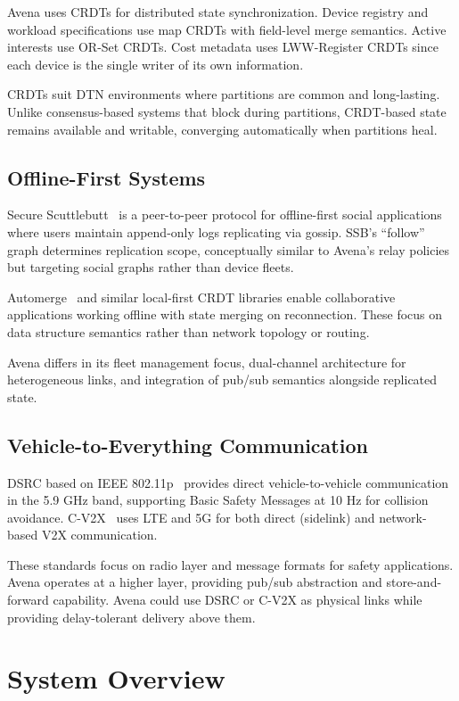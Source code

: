 \documentclass[journal]{IEEEtran}
\begin{document}
Avena uses CRDTs for distributed state synchronization. Device registry and workload specifications use map CRDTs with field-level merge semantics. Active interests use OR-Set CRDTs. Cost metadata uses LWW-Register CRDTs since each device is the single writer of its own information.

CRDTs suit DTN environments where partitions are common and long-lasting. Unlike consensus-based systems that block during partitions, CRDT-based state remains available and writable, converging automatically when partitions heal.

\subsection{Offline-First Systems}

Secure Scuttlebutt~\cite{tarr2019ssb} is a peer-to-peer protocol for offline-first social applications where users maintain append-only logs replicating via gossip. SSB's ``follow'' graph determines replication scope, conceptually similar to Avena's relay policies but targeting social graphs rather than device fleets.

Automerge~\cite{kleppmann2017automerge} and similar local-first CRDT libraries enable collaborative applications working offline with state merging on reconnection. These focus on data structure semantics rather than network topology or routing.

Avena differs in its fleet management focus, dual-channel architecture for heterogeneous links, and integration of pub/sub semantics alongside replicated state.

\subsection{Vehicle-to-Everything Communication}

DSRC based on IEEE 802.11p~\cite{ieee80211p} provides direct vehicle-to-vehicle communication in the 5.9 GHz band, supporting Basic Safety Messages at 10 Hz for collision avoidance. C-V2X~\cite{3gpp36885} uses LTE and 5G for both direct (sidelink) and network-based V2X communication.

These standards focus on radio layer and message formats for safety applications. Avena operates at a higher layer, providing pub/sub abstraction and store-and-forward capability. Avena could use DSRC or C-V2X as physical links while providing delay-tolerant delivery above them.


\section{System Overview}
\label{sec:overview}
\end{document}
